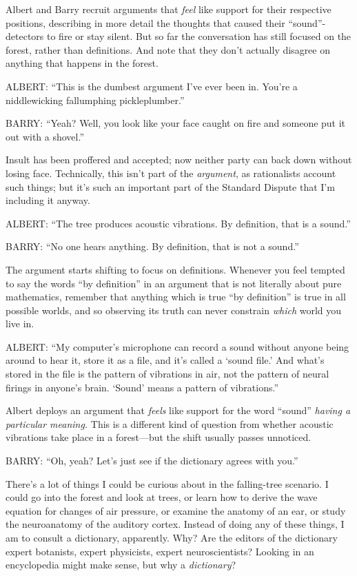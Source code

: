 {
 Albert and Barry recruit arguments that \textit{feel} like support
for their respective positions, describing in more detail the thoughts
that caused their
``sound''-detectors to fire or stay
silent. But so far the conversation has still focused on the forest,
rather than definitions. And note that they don't
actually disagree on anything that happens in the forest.}

{
 ALBERT: ``This is the dumbest argument
I've ever been in. You're a
niddlewicking fallumphing pickleplumber.''}

{
 BARRY: ``Yeah? Well, you look like your face
caught on fire and someone put it out with a
shovel.''}

{
 Insult has been proffered and accepted; now neither party can back
down without losing face. Technically, this isn't part
of the \textit{argument}, as rationalists account such things; but
it's such an important part of the Standard Dispute
that I'm including it anyway.}

{
 ALBERT: ``The tree produces acoustic vibrations.
By definition, that is a sound.''}

{
 BARRY: ``No one hears anything. By definition,
that is not a sound.''}

{
 The argument starts shifting to focus on definitions. Whenever you
feel tempted to say the words ``by
definition'' in an argument that is not literally
about pure mathematics, remember that anything which is true
``by definition'' is true in all
possible worlds, and so observing its truth can never constrain
\textit{which} world you live in.}

{
 ALBERT: ``My computer's
microphone can record a sound without anyone being around to hear it,
store it as a file, and it's called a
`sound file.' And what's
stored in the file is the pattern of vibrations in air, not the pattern
of neural firings in anyone's brain.
`Sound' means a pattern of
vibrations.''}

{
 Albert deploys an argument that \textit{feels} like support for
the word ``sound'' \textit{having a
particular meaning.} This is a different kind of question from whether
acoustic vibrations take place in a forest---but the shift usually
passes unnoticed.}

{
 BARRY: ``Oh, yeah? Let's just see
if the dictionary agrees with you.''}

{
 There's a lot of things I could be curious about
in the falling-tree scenario. I could go into the forest and look at
trees, or learn how to derive the wave equation for changes of air
pressure, or examine the anatomy of an ear, or study the neuroanatomy
of the auditory cortex. Instead of doing any of these things, I am to
consult a dictionary, apparently. Why? Are the editors of the
dictionary expert botanists, expert physicists, expert neuroscientists?
Looking in an encyclopedia might make sense, but why a
\textit{dictionary}?}

